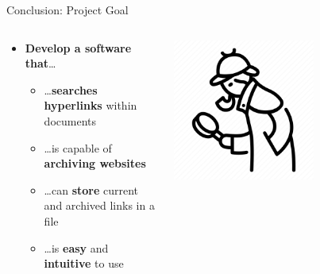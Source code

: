 \documentclass[
ngerman,%
authorontitle=true,
]{bfhbeamer}
\begin{document}
	\begin{frame}{Conclusion: Project Goal}
		\begin{columns} %
			\begin{column}{0.5\textwidth} %
				\begin{itemize}
					\item[\checkmark] \textbf{Develop a software that}\ldots
					\begin{itemize}
						\item[\checkmark] \ldots \textbf{searches hyperlinks} within documents
						\item[\checkmark] \ldots is capable of \textbf{archiving websites}
						\item[\checkmark] \ldots can \textbf{store} current and archived links in a file
						\item[\checkmark] \ldots is \textbf{easy} and \textbf{intuitive} to use
					\end{itemize}
				\end{itemize}
			\end{column}
			\begin{column}{0.3\textwidth} %
				\begin{center}
					\includegraphics[width=0.6\textwidth]{pictures/sherlock}
				\end{center}
			\end{column}
		\end{columns}
	\end{frame}
	
\end{document}
